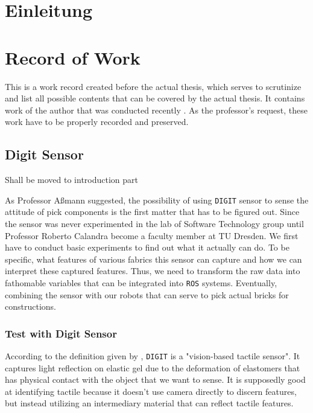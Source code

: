 {\chapter{Einleitung}}
{\chapter{Record of Work}}

\label{sec:outline}
This is a work record created before the actual thesis, which serves to scrutinize and list all possible contents that can be covered by the actual thesis. It contains work of the author that was conducted recently . As the professor's request, these work have to be properly recorded and preserved.

\section{Digit Sensor}
{\Large\color{red} Shall be moved to introduction part}

As Professor Aßmann suggested, the possibility of using \texttt{DIGIT} sensor \cite{Mike2020} to sense the attitude of pick components is the first matter that has to be figured out. Since the sensor was never experimented in the lab of Software Technology group until Professor Roberto Calandra become a faculty member at TU Dresden. We first have to conduct basic experiments to find out what it actually can do. To be specific, what features of various fabrics this sensor can capture and how we can interpret these captured features. Thus, we need to transform the raw data into fathomable variables that can be integrated into \texttt{ROS} systems. Eventually, combining the sensor with our robots that can serve to pick actual bricks for constructions.

\subsection{Test with Digit Sensor}
According to the definition given by \cite{Mike2020}, \texttt{DIGIT} is a "vision-based tactile sensor". It captures light reflection on elastic gel due to the deformation of elastomers that has physical contact with the object that we want to sense. It is supposedly good at identifying tactile because it doesn't use camera directly to discern features, but instead utilizing an intermediary material that can reflect tactile features.

